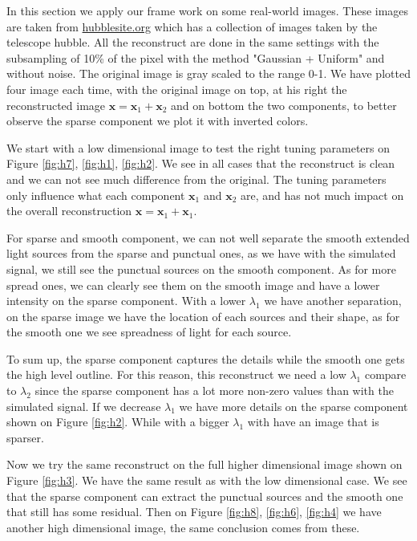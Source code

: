\documentclass[a4paper,11pt,oneside]{report}
\theoremstyle{named}
\begin{document}
In this section we apply our frame work on some real-world images. These images are taken from \href{https://hubblesite.org/resource-gallery/images}{hubblesite.org} which has a collection of images taken by the telescope hubble. All the reconstruct are done in the same settings with the subsampling of 10\% of the pixel with the method "Gaussian + Uniform" and without noise. The original image is gray scaled to the range 0-1. We have plotted four image each time, with the original image on top, at his right the reconstructed image $\boldsymbol{x} = \boldsymbol{x}_1 + \boldsymbol{x}_2$ and on bottom the two components, to better observe the sparse component we plot it with inverted colors.

We start with a low dimensional image to test the right tuning parameters on Figure \ref{fig:h7}, \ref{fig:h1}, \ref{fig:h2}. We see in all cases that the reconstruct is clean and we can not see much difference from the original. The tuning parameters only influence what each component $\boldsymbol{x}_1$ and $\boldsymbol{x}_2$ are, and has not much impact on the overall reconstruction $\boldsymbol{x} = \boldsymbol{x}_1 + \boldsymbol{x}_1$. 

For sparse and smooth component, we can not well separate the smooth extended light sources from the sparse and punctual ones, as we have with the simulated signal, we still see the punctual sources on the smooth component.  As for more spread ones, we can clearly see them on the smooth image and have a lower intensity on the sparse component. With a lower $\lambda_1$ we have another separation, on the sparse image we have the location of each sources and their shape, as for the smooth one we see spreadness of light for each source. 

To sum up, the sparse component captures the details while the smooth one gets the high level outline. For this reason, this reconstruct we need a low $\lambda_1$ compare to $\lambda_2$ since the sparse component has a lot more non-zero values than with the simulated signal. If we decrease $\lambda_1$ we have more details on the sparse component shown on Figure \ref{fig:h2}. While with a bigger $\lambda_1$ with have an image that is sparser.

Now we try the same reconstruct on the full higher dimensional image shown on Figure \ref{fig:h3}. We have the same result as with the low dimensional case. We see that the sparse component can extract the punctual sources and the smooth one that still has some residual. Then on Figure \ref{fig:h8}, \ref{fig:h6}, \ref{fig:h4} we have another high dimensional image, the same conclusion comes from these. 
\end{document}
